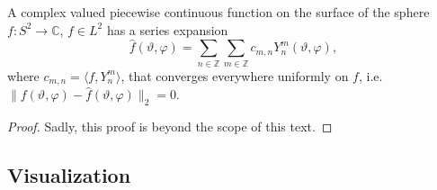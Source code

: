 \begin{theorem}
  A complex valued piecewise continuous function on the surface of the sphere
  $f: S^2 \to \mathbb{C}$, $f \in L^2$ has a series expansion
  \begin{equation*}
    \hat{f}(\vartheta, \varphi) 
    = \sum_{n \in \mathbb{Z}} \sum_{m \in \mathbb{Z}}
      c_{m,n} Y^m_n(\vartheta, \varphi),
  \end{equation*}
  where $c_{m,n} = \langle f, Y^m_n \rangle$, that converges everywhere uniformly
  on $f$, i.e. $\|f(\vartheta, \varphi) - \hat{f}(\vartheta, \varphi)\|_2 = 0$.
\end{theorem}
\begin{proof}
  Sadly, this proof is beyond the scope of this text.
\end{proof}
\fi

\subsection{Visualization}
